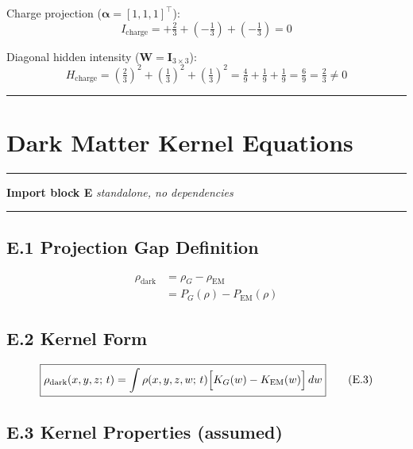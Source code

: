 \documentclass[11pt, a4paper, oneside]{article}
\theoremstyle{definition}
\theoremstyle{plain}
\theoremstyle{remark}
\begin{document}
Charge projection ($\bm{\alpha} = [1, 1, 1]^\top$):
\begin{equation}
  I_\text{charge}
  = +\tfrac{2}{3} + (-\tfrac{1}{3}) + (-\tfrac{1}{3})
  = 0
  \tag{D.5}
\end{equation}

Diagonal hidden intensity ($\mathbf{W} = \mathbf{I}_{3\times 3}$):
\begin{equation}
  H_\text{charge}
  = \left(\tfrac{2}{3}\right)^2
  + \left(\tfrac{1}{3}\right)^2
  + \left(\tfrac{1}{3}\right)^2
  = \tfrac{4}{9} + \tfrac{1}{9} + \tfrac{1}{9}
  = \tfrac{6}{9}
  = \tfrac{2}{3}
  \neq 0
  \tag{D.6}
\end{equation}

\noindent\rule{\linewidth}{0.4pt}

\section{Dark Matter Kernel Equations}
\label{sec:dark}

\noindent\rule{\linewidth}{0.8pt}
\textbf{Import block E} \hfill \textit{standalone, no dependencies}
\noindent\rule{\linewidth}{0.4pt}

\subsection*{E.1 Projection Gap Definition}

\begin{align}
  \rho_\text{dark}
  &= \rho_G - \rho_\text{EM}
  \tag{E.1} \\
  &= P_G(\rho) - P_\text{EM}(\rho)
  \tag{E.2}
\end{align}

\subsection*{E.2 Kernel Form}

\begin{equation}
  \boxed{
	\rho_\text{dark}(x,y,z;\,t)
	= \int \rho(x,y,z,w;\,t)
	  \Bigl[K_G(w) - K_\text{EM}(w)\Bigr]\, dw
  }
  \tag{E.3}
\end{equation}

\subsection*{E.3 Kernel Properties (assumed)}
\end{document}
